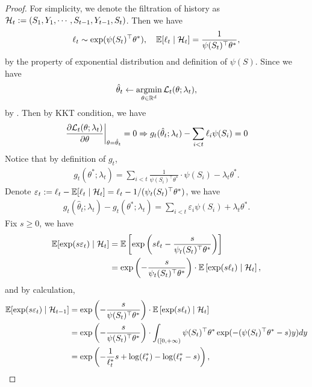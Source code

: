 \begin{lemma}
\begin{proof}
For simplicity, we denote the filtration of history as  ${\mathcal{H}}_t := \left( S_1, Y_1, \cdots, S_{t-1}, Y_{t-1}, S_t \right)$. Then we have
\begin{align*}
    \ell_t \sim \exp(\psi(S_t)^\top \theta^*), \quad \mathbb{E}[\ell_t \mid {\mathcal{H}}_t] = \frac{1}{\psi(S_t)^\top\theta^*},
\end{align*}
by the property of exponential distribution and definition of $\psi(S)$. Since we have
\begin{align*}
    \hat\theta_t \leftarrow \operatorname*{argmin}_{\theta \in \mathbb{R}^d} {\mathcal{L}}_t(\theta; \lambda_t),
\end{align*}
by . Then by KKT condition, we have
\begin{align*}
   \left.\frac{\partial {\mathcal{L}}_t(\theta ; \lambda_t)}{\partial \theta} \right|_{\theta = \hat\theta_t} = 0 \Rightarrow g_t(\hat\theta_t; \lambda_t) - \sum_{i < t} \ell_i\psi(S_i) = 0
\end{align*}
Notice that by definition of $g_t$, 
\begin{align*}
    g_t(\theta^*; \lambda_t) =  \sum_{i < t}  \frac{1}{\psi(S_i)^\top \theta^*} \cdot \psi(S_i) - \lambda_t \theta^*.
\end{align*}
Denote $\varepsilon_t := \ell_t - \mathbb{E}[\ell_t \mid {\mathcal{H}}_t] = \ell_t - {1}/({\psi_t(S_t)^\top\theta^*})$, we have
\begin{align*}
    g_t(\hat \theta_t; \lambda_t) - g_t(\theta^*; \lambda_t) = \sum_{i < t} \varepsilon_i \psi(S_i) + \lambda_t \theta^*.
\end{align*}
Fix $s \ge 0$, we have
\begin{align*}
    \mathbb{E}[\exp(s\varepsilon_t) \mid {\mathcal{H}}_t] &= \mathbb{E}\left[\exp\left(s\ell_t - \frac{s}{\psi_t(S_t)^\top\theta^*}\right)\right] \\
    &= \exp\left(- \frac{s}{\psi_t(S_t)^\top\theta^*}\right)\cdot \mathbb{E}\left[\exp(s\ell_t)\mid {\mathcal{H}}_t\right],
\end{align*}
and by calculation,
\begin{align*}
    \mathbb{E}[\exp(s\varepsilon_t) \mid {\mathcal{H}}_{t-1}] &= \exp\left(- \frac{s}{\psi(S_t)^\top\theta^*}\right)\cdot \mathbb{E}\left[\exp(s\ell_t)\mid {\mathcal{H}}_t\right] \\
    &=\exp\left(- \frac{s}{\psi(S_t)^\top\theta^*}\right)\cdot \int_{([0,+\infty)} \psi(S_t)^\top\theta^*\exp(-(\psi(S_t)^\top\theta^* - s)y)dy \\
    &= \exp\left(-\frac{1}{\ell_t^*}s + \log(\ell_t^*) - \log(\ell_t^* - s)\right),
\end{align*}

\end{proof}
\end{lemma}

